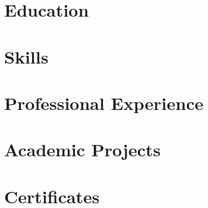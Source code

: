 \documentclass[letter,10pt]{article}
\begin{document}


\section{Education}


\section{Skills}


\section{Professional Experience}


\section{Academic Projects}


\section{Certificates}


% 
\end{document}
